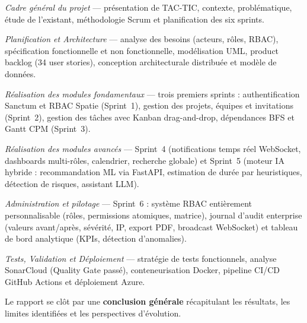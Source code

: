 \begin{description}[leftmargin=3.5cm, style=nextline]
  \item[Chapitre I] \textit{Cadre général du projet} — présentation de TAC-TIC,
        contexte, problématique, étude de l'existant, méthodologie Scrum et
        planification des six sprints.

  \item[Chapitre II] \textit{Planification et Architecture} — analyse des besoins
        (acteurs, rôles, RBAC), spécification fonctionnelle et non fonctionnelle,
        modélisation UML, product backlog (34 user stories), conception architecturale
        distribuée et modèle de données.

  \item[Chapitre III] \textit{Réalisation des modules fondamentaux} — trois premiers
        sprints : authentification Sanctum et RBAC Spatie (Sprint~1), gestion des
        projets, équipes et invitations (Sprint~2), gestion des tâches avec Kanban
        drag-and-drop, dépendances BFS et Gantt CPM (Sprint~3).

  \item[Chapitre IV] \textit{Réalisation des modules avancés} — Sprint~4 (notifications
        temps réel WebSocket, dashboards multi-rôles, calendrier, recherche globale)
        et Sprint~5 (moteur IA hybride : recommandation ML via FastAPI, estimation
        de durée par heuristiques, détection de risques, assistant LLM).

  \item[Chapitre V] \textit{Administration et pilotage} — Sprint~6 : système RBAC
        entièrement personnalisable (rôles, permissions atomiques, matrice), journal
        d'audit enterprise (valeurs avant/après, sévérité, IP, export PDF, broadcast
        WebSocket) et tableau de bord analytique (KPIs, détection d'anomalies).

  \item[Chapitre VI] \textit{Tests, Validation et Déploiement} — stratégie de tests
        fonctionnels, analyse SonarCloud (Quality Gate passé), conteneurisation Docker,
        pipeline CI/CD GitHub Actions et déploiement Azure.
\end{description}

\medskip
Le rapport se clôt par une \textbf{conclusion générale} récapitulant les résultats,
les limites identifiées et les perspectives d'évolution.
